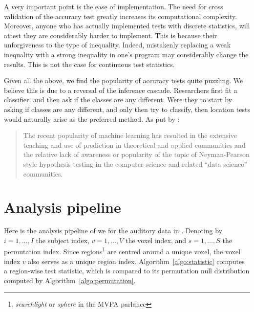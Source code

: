 \documentclass[12pt,a4paper]{article}
\begin{document}
A very important point is the ease of implementation. 
The need for cross validation of the accuracy test greatly increases its computational complexity. 
Moreover, anyone who has actually implemented tests with discrete statistics, will attest they are considerably harder to implement. This is because their unforgiveness to the type of inequality. 
Indeed, mistakenly replacing a weak inequality with a strong inequality in one's program may considerably change the results. 
This is not the case for continuous test statistics. 

Given all the above, we find the popularity of accuracy tests quite puzzling. 
We believe this is due to a reversal of the inference cascade. 
Researchers first fit a classifier, and then ask if the classes are any different.
Were they to start by asking if classes are any different, and only then try to classify, then location tests would naturally arise as the preferred method. 
As put by \cite{ramdas_classification_2016}:
\begin{quote}
The recent popularity of machine learning has resulted in the extensive teaching and use
of prediction in theoretical and applied communities and the relative lack of awareness or
popularity of the topic of Neyman-Pearson style hypothesis testing in the computer science
and related ``data science'' communities.
\end{quote}





















\appendix


\newpage

\section{Analysis pipeline}
\label{apx:analysis}

Here is the analysis pipeline of \cite{stelzer_statistical_2013} we for the auditory data in \cite{gilron_quantifying_2016}.
Denoting by 
$i=1,\dots,I$ the subject index, 
$v=1,\dots,V$ the voxel index, and 
$s = 1,\dots,S$ the permutation index. 
Since regions\footnote{\emph{searchlight} or \emph{sphere} in the MVPA parlance} are centred around a unique voxel, the voxel index $v$ also serves as a unique region index.
Algorithm~\ref{algo:statistic} computes a region-wise test statistic, which is compared to its permutation null distribution computed by Algorithm~\ref{algo:permutation}.
\end{document}
